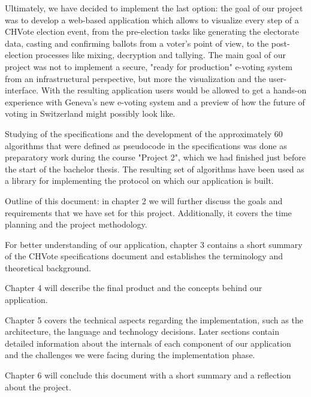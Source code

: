 Ultimately, we have decided to implement the last option: the goal of our project was to develop a web-based application which allows to visualize every step of a CHVote election event, from the pre-election tasks like generating the electorate data, casting and confirming ballots from a voter's point of view, to the post-election processes like mixing, decryption and tallying. The main goal of our project was not to implement a secure, "ready for production" e-voting system from an infrastructural perspective, but more the visualization and the user-interface. With the resulting application users would be allowed to get a hands-on experience with Geneva's new e-voting system and a preview of how the future of voting in Switzerland might possibly look like.

Studying of the specifications and the development of the approximately 60 algorithms that were defined as pseudocode in the specifications was done as preparatory work during the course "{}Project 2"{}, which we had finished just before the start of the bachelor thesis. The resulting set of algorithms have been used as a library for implementing the protocol on which our application is built.

Outline of this document: in chapter 2 we will further discuss the goals and requirements that we have set for this project. Additionally, it covers the time planning and the project methodology.

For better understanding of our application, chapter 3 contains a short summary of the CHVote specifications document and establishes the terminology and theoretical background.

Chapter 4 will describe the final product and the concepts behind our application.

Chapter 5 covers the technical aspects regarding the implementation, such as the architecture, the language and technology decisions. Later sections contain detailed information about the internals of each component of our application and the challenges we were facing during the implementation phase.

Chapter 6 will conclude this document with a short summary and a reflection about the project.
